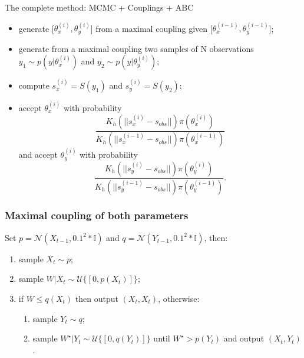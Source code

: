 \documentclass{beamer}
\begin{document}
\begin{section}{The complete method: MCMC + Couplings + ABC}
\begin{frame}
{\begin{enumerate}
\begin{itemize}
					\item generate [$\theta_{x}^{(i)},\theta_{y}^{(i)}$] from a maximal coupling given [$\theta_{x}^{(i-1)},\theta_{y}^{(i-1)}$];
					\item generate from a maximal coupling two samples of N observations $y_{1} \sim p(y|\theta_{x}^{(i)})$ and $y_{2} \sim p(y|\theta_{y}^{(i)})$;
					\item compute $s_{x}^{(i)}=S(y_{1})$ and $s_{y}^{(i)}=S(y_{2})$;
					\item accept $\theta_{x}^{(i)}$ with probability 
					$$
					\frac{
						K_h(||s_{x}^{(i)}-s_{obs}||)\pi(\theta_{x}^{(i)})
					}{
						K_h(||s_{x}^{(i-1)}-s_{obs}||)\pi(\theta_{x}^{(i-1)})
					}
					$$
					and accept $\theta_{y}^{(i)}$ with probability
					$$
					\frac{
						K_h(||s_{y}^{(i)}-s_{obs}||)\pi(\theta_{y}^{(i)})
					}{
						K_h(||s_{y}^{(i-1)}-s_{obs}||)\pi(\theta_{y}^{(i-1)})
					}.
					$$ 
				\end{itemize}
				
				
			\end{enumerate}
		}
		
		
	\end{frame}

\begin{frame}
	\frametitle{Maximal coupling of both parameters }
	Set $p = \mathcal{N}(X_{t-1},0.1^2*\mathbb{I})$ and $q = \mathcal{N}(Y_{t-1},0.1^2*\mathbb{I})$, then:
	\begin{enumerate}
		\item sample $X_t \sim p$;
		\item sample $W|X_t \sim \mathcal{U}\{[0,p(X_t)]\}$;
		\item if $W\leq q(X_t)$ then output $(X_t,X_t)$, otherwise:
		\begin{enumerate}
			\item sample $Y_t \sim q$;
			\item sample $W^\star | Y_t \sim \mathcal{U}\{[0, q(Y_t)]\}$ 
			until $W^\star > p(Y_t)$ and output $(X_t,Y_t)$.
		\end{enumerate}
	\end{enumerate}
\end{frame}


\end{section}
\end{document}
